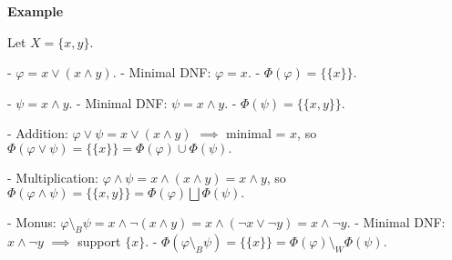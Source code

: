 \textbf{Example}

Let \(X=\{x,y\}\).

- \(\varphi = x \vee (x\wedge y)\).  
  - Minimal DNF: \(\varphi = x\).  
  - \(\Phi(\varphi) = \{\{x\}\}.\)

- \(\psi = x \wedge y\).  
  - Minimal DNF: \(\psi = x\wedge y\).  
  - \(\Phi(\psi) = \{\{x,y\}\}.\)

- Addition:  
  \(\varphi \vee \psi = x \vee (x\wedge y)\) $\implies$ minimal = \(x\), so  
  \(\Phi(\varphi\vee\psi) = \{\{x\}\} = \Phi(\varphi)\cup\Phi(\psi).\)

- Multiplication:  
  \(\varphi \wedge \psi = x\wedge(x\wedge y) = x\wedge y\), so  
  \(\Phi(\varphi\wedge\psi) = \{\{x,y\}\} = \Phi(\varphi)\bigsqcup\Phi(\psi).\)

- Monus:  
  \(\varphi\setminus_B\psi = x\wedge\neg(x\wedge y) = x\wedge(\neg x\vee\neg y) = x\wedge\neg y\).  
  - Minimal DNF: \(x\wedge\neg y\) $\implies$ support \(\{x\}\).  
  - \(\Phi(\varphi\setminus_B\psi) = \{\{x\}\} = \Phi(\varphi)\setminus_W\Phi(\psi).\)